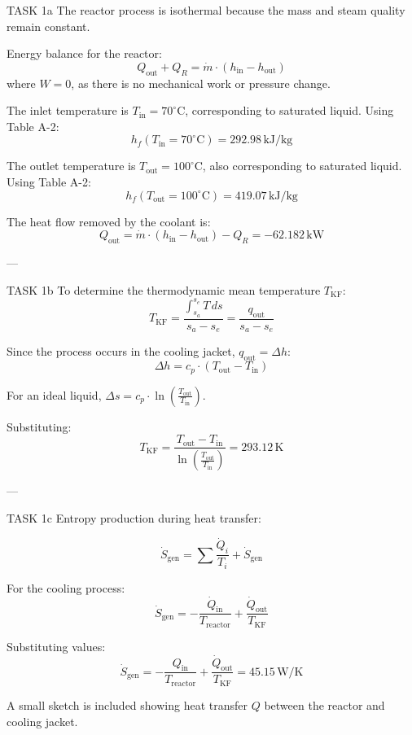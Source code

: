 TASK 1a  
The reactor process is isothermal because the mass and steam quality remain constant.  

Energy balance for the reactor:  
\[
Q_{\text{out}} + Q_R = \dot{m} \cdot (h_{\text{in}} - h_{\text{out}})
\]  
where \( W = 0 \), as there is no mechanical work or pressure change.  

The inlet temperature is \( T_{\text{in}} = 70^\circ\text{C} \), corresponding to saturated liquid. Using Table A-2:  
\[
h_f(T_{\text{in}} = 70^\circ\text{C}) = 292.98 \, \text{kJ/kg}
\]  

The outlet temperature is \( T_{\text{out}} = 100^\circ\text{C} \), also corresponding to saturated liquid. Using Table A-2:  
\[
h_f(T_{\text{out}} = 100^\circ\text{C}) = 419.07 \, \text{kJ/kg}
\]  

The heat flow removed by the coolant is:  
\[
Q_{\text{out}} = \dot{m} \cdot (h_{\text{in}} - h_{\text{out}}) - Q_R = -62.182 \, \text{kW}
\]  

---

TASK 1b  
To determine the thermodynamic mean temperature \( T_{\text{KF}} \):  
\[
T_{\text{KF}} = \frac{\int_{s_a}^{s_e} T \, ds}{s_a - s_e} = \frac{q_{\text{out}}}{s_a - s_e}
\]  

Since the process occurs in the cooling jacket, \( q_{\text{out}} = \Delta h \):  
\[
\Delta h = c_p \cdot (T_{\text{out}} - T_{\text{in}})
\]  

For an ideal liquid, \( \Delta s = c_p \cdot \ln\left(\frac{T_{\text{out}}}{T_{\text{in}}}\right) \).  

Substituting:  
\[
T_{\text{KF}} = \frac{T_{\text{out}} - T_{\text{in}}}{\ln\left(\frac{T_{\text{out}}}{T_{\text{in}}}\right)} = 293.12 \, \text{K}
\]  

---

TASK 1c  
Entropy production during heat transfer:  

\[
\dot{S}_{\text{gen}} = \sum \frac{\dot{Q}_i}{T_i} + \dot{S}_{\text{gen}}
\]  

For the cooling process:  
\[
\dot{S}_{\text{gen}} = -\frac{\dot{Q}_{\text{in}}}{T_{\text{reactor}}} + \frac{\dot{Q}_{\text{out}}}{T_{\text{KF}}}
\]  

Substituting values:  
\[
\dot{S}_{\text{gen}} = -\frac{Q_{\text{in}}}{T_{\text{reactor}}} + \frac{\dot{Q}_{\text{out}}}{T_{\text{KF}}} = 45.15 \, \text{W/K}
\]  

A small sketch is included showing heat transfer \( Q \) between the reactor and cooling jacket.